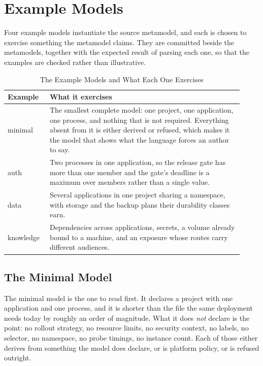 \section{Example Models}
\label{sec:examplemodels}

Four example models instantiate the source metamodel, and each is chosen to
exercise something the metamodel claims. They are committed beside the
metamodels, together with the expected result of parsing each one, so that the
examples are checked rather than illustrative.

\begin{table}[!htbp]
\centering
\small
\begin{tabular}{>{\raggedright\arraybackslash}p{0.16\linewidth}>{\raggedright\arraybackslash}p{0.76\linewidth}}
\hline
\textbf{Example} & \textbf{What it exercises} \\
\hline
minimal & The smallest complete model: one project, one application, one
  process, and nothing that is not required. Everything absent from it is
  either derived or refused, which makes it the model that shows what the
  language forces an author to say. \\
auth & Two processes in one application, so the release gate has more than one
  member and the gate's deadline is a maximum over members rather than a single
  value. \\
data & Several applications in one project sharing a namespace, with storage
  and the backup plans their durability classes earn. \\
knowledge & Dependencies across applications, secrets, a volume already bound
  to a machine, and an exposure whose routes carry different audiences. \\
\hline
\end{tabular}
\caption{The Example Models and What Each One Exercises}
\label{tab:examples}
\end{table}

\subsection{The Minimal Model}

The minimal model is the one to read first. It declares a project with one
application and one process, and it is shorter than the file the same deployment
needs today by roughly an order of magnitude. What it does \emph{not} declare is
the point: no rollout strategy, no resource limits, no security context, no
labels, no selector, no namespace, no probe timings, no instance count. Each of
those either derives from something the model does declare, or is platform
policy, or is refused outright.

